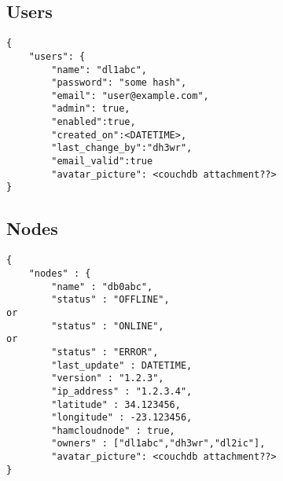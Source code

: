 \documentclass[a4paper]{article}
\begin{document}
\subsection{Users}

\begin{lstlisting}
{
    "users": {
        "name": "dl1abc",
        "password": "some hash",
        "email": "user@example.com",
        "admin": true,
        "enabled":true,
        "created_on":<DATETIME>,
        "last_change_by":"dh3wr",
        "email_valid":true
        "avatar_picture": <couchdb attachment??>
}
\end{lstlisting}

\subsection{Nodes}
\begin{lstlisting}
{
    "nodes" : {
        "name" : "db0abc",
        "status" : "OFFLINE",
or
        "status" : "ONLINE",
or
        "status" : "ERROR",
        "last_update" : DATETIME,
        "version" : "1.2.3",
        "ip_address" : "1.2.3.4",
        "latitude" : 34.123456,
        "longitude" : -23.123456,
        "hamcloudnode" : true,
        "owners" : ["dl1abc","dh3wr","dl2ic"],
        "avatar_picture": <couchdb attachment??>
}
\end{lstlisting}
\end{document}
